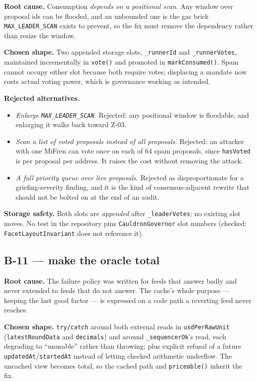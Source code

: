 \documentclass[11pt,a4paper]{article}
\newcommand{\code}[1]{\texttt{\small #1}}
\begin{document}
\textbf{Root cause.} Consumption \emph{depends on a positional scan}. Any window over
proposal ids can be flooded, and an unbounded one is the gas brick \code{MAX\_LEADER\_SCAN}
exists to prevent, so the fix must remove the dependency rather than resize the window.

\textbf{Chosen shape.} Two appended storage slots, \code{\_runnerId} and
\code{\_runnerVotes}, maintained incrementally in \code{vote()} and promoted in
\code{markConsumed()}. Spam cannot occupy either slot because both require votes;
displacing a mandate now costs actual voting power, which is governance working as
intended.

\textbf{Rejected alternatives.}
\begin{itemize}
\item \emph{Enlarge \code{MAX\_LEADER\_SCAN}.} Rejected: any positional window is
      floodable, and enlarging it walks back toward Z-03.
\item \emph{Scan a list of voted proposals instead of all proposals.} Rejected: an attacker
      with one MiFren can vote once on each of 64 spam proposals, since \code{hasVoted} is
      per proposal per address. It raises the cost without removing the attack.
\item \emph{A full priority queue over live proposals.} Rejected as disproportionate for a
      griefing-severity finding, and it is the kind of consensus-adjacent rewrite that
      should not be bolted on at the end of an audit.
\end{itemize}

\textbf{Storage safety.} Both slots are \emph{appended} after \code{\_leaderVotes}; no
existing slot moves. No test in the repository pins \code{CauldronGovernor} slot numbers
(checked: \code{FacetLayoutInvariant} does not reference it).

\subsection{B-11 --- make the oracle total}

\textbf{Root cause.} The failure policy was written for feeds that answer badly and never
extended to feeds that do not answer. The cache's whole purpose --- keeping the last good
factor --- is expressed on a code path a reverting feed never reaches.

\textbf{Chosen shape.} \code{try/catch} around both external reads in
\code{usdPerRawUnit} (\code{latestRoundData} and \code{decimals}) and around
\code{\_sequencerOk}'s read, each degrading to ``unusable'' rather than throwing; plus
explicit refusal of a future \code{updatedAt}/\code{startedAt} instead of letting checked
arithmetic underflow. The uncached view becomes total, so the cached path and
\code{priceable()} inherit the fix.
\end{document}
